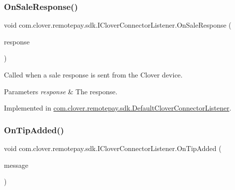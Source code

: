 \mbox{\label{interfacecom_1_1clover_1_1remotepay_1_1sdk_1_1_i_clover_connector_listener_a7a3aefe10180145d42d02a6a391b0113}} 
\subsubsection{\texorpdfstring{On\+Sale\+Response()}{OnSaleResponse()}}
{\footnotesize\ttfamily void com.\+clover.\+remotepay.\+sdk.\+I\+Clover\+Connector\+Listener.\+On\+Sale\+Response (\begin{DoxyParamCaption}\item[{\hyperlink{classcom_1_1clover_1_1remotepay_1_1sdk_1_1_sale_response}{Sale\+Response}}]{response }\end{DoxyParamCaption})}



Called when a sale response is sent from the Clover device. 


\begin{DoxyParams}{Parameters}
{\em response} & The response.\\
\hline
\end{DoxyParams}


Implemented in \hyperlink{classcom_1_1clover_1_1remotepay_1_1sdk_1_1_default_clover_connector_listener_a1a562a3f2e2f786ada3beeeec083fe83}{com.\+clover.\+remotepay.\+sdk.\+Default\+Clover\+Connector\+Listener}.

\mbox{\label{interfacecom_1_1clover_1_1remotepay_1_1sdk_1_1_i_clover_connector_listener_a39348a8d97a69efbbdf03e3ccbdced7d}} 
\subsubsection{\texorpdfstring{On\+Tip\+Added()}{OnTipAdded()}}
{\footnotesize\ttfamily void com.\+clover.\+remotepay.\+sdk.\+I\+Clover\+Connector\+Listener.\+On\+Tip\+Added (\begin{DoxyParamCaption}\item[{Tip\+Added\+Message}]{message }\end{DoxyParamCaption})}




